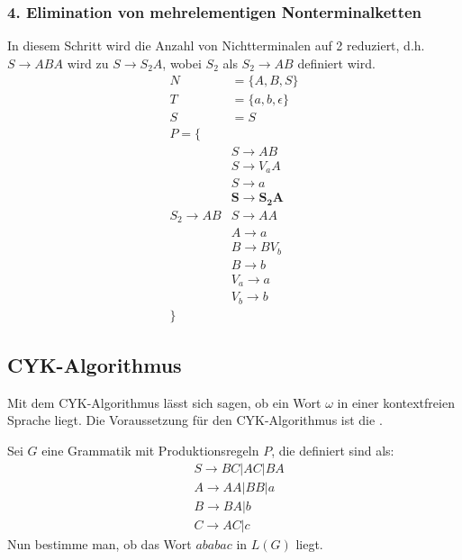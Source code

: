 \subsubsection{4. Elimination von mehrelementigen Nonterminalketten}
In diesem Schritt wird die Anzahl von Nichtterminalen auf 2 reduziert, d.h. $S\to ABA$ wird zu $S\to S_2A$, wobei $S_2$ als $S_2\to AB$ definiert wird.
\begin{align*}
    N&=\{A,B,S\}\\
    T&=\{a,b,\epsilon\}\\
    S&=S\\
    P=\{\\
    &S\to AB\\
    &S\to V_{a}A\\
    &S\to a\\
    &\mathbf{S\to S_2A}\\
    S_2\to AB
    &S\to AA\\
    &A\to a\\
    &B\to BV_b\\
    &B\to b\\
    &V_a\to a\\
    &V_b\to b\\
    \}
\end{align*}
\subsection{CYK-Algorithmus}
\label{cyk}
Mit dem CYK-Algorithmus lässt sich sagen, ob ein Wort $\omega$ in einer kontextfreien Sprache liegt. Die Voraussetzung für den CYK-Algorithmus ist die .
\begin{bsp}
    Sei $G$ eine Grammatik mit Produktionsregeln $P$, die definiert sind als:
    \begin{align*}
        &S\to BC|AC|BA\\
        &A\to AA|BB|a\\
        &B\to BA|b\\
        &C\to AC|c
    \end{align*}
    Nun bestimme man, ob das Wort $ababac$ in $L(G)$ liegt.
\end{bsp}

